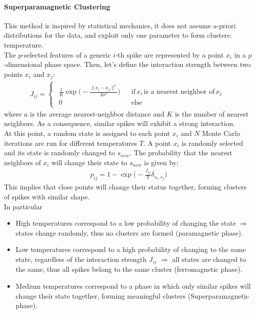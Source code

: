 \paragraph{Superparamagnetic Clustering}
This method is inspired by statistical mechanics, it does not assume
a-priori distributions for the data, and exploit only one parameter to
form clusters: temperature.\\
The \(p\)-selected features of a generic \(i\)-th spike are represented by a
point \(x_i\) in a \(p\)-dimensional phase space. Then, let's define the
interaction strength between two points \(x_i\) and \(x_j\):
\begin{align*}
    J_{ij}=
    \begin{cases}
        \begin{matrix}
            \frac{1}{K}\exp{\biggl(-\frac{\|x_i-x_j\|^2}{2a^2}\biggr)} &  & \text{if}\,x_i\,\text{is a nearest neighbor of}\,x_j \\
            0                                                          &  & \text{else}
        \end{matrix}
    \end{cases}
\end{align*}
where \(a\) is the average nearest-neighbor distance and \(K\) is the
number of nearest neighbors.
As a consequence, similar spikes will exhibit a strong interaction.\\
At this point, a random state is assigned to each point \(x_i\) and \(N\) Monte
Carlo iterations are run for different temperatures \(T\). A point \(x_i\) is
randomly selected and its state is randomly changed to \(s_{new}\).
The probability that the nearest neighbors of \(x_i\) will change their state
to \(s_{new}\) is given by:
\begin{align*}
    p_{ij}=1-\exp{\biggl(-\frac{J_{ij}}{T}\delta_{s_i,s_j}\biggr)}
\end{align*}
This implies that close points will change their status together,
forming clusters of spikes with similar shape.\\
In particular
\begin{itemize}
    \item High temperatures correspond to a low probability of
          changing the state \(\Rightarrow\) states change randomly, thus no clusters
          are formed (paramagnetic phase).
    \item Low temperatures correspond to a high probability of changing to the
          same state, regardless of the interaction strength \(J_{ij}\)
          \(\Rightarrow\) all states are changed to the same, thus all spikes belong
          to the same cluster (ferromagnetic phase).
    \item Medium temperatures correspond to a phase in which only similar spikes
          will change their state together, forming meaningful clusters
          (Superparamagnetic phase).
\end{itemize}


